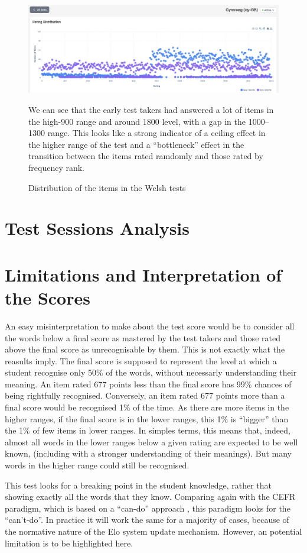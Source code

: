 \begin{figure}
    \centering
    \includegraphics[width=0.8\linewidth]{figures/cy-distribution.png}
    \caption{Distribution of the items in the Welsh tests}
    \medskip
    \small
    We can see that the early test takers had answered a lot of items in the high-900 range and around 1800 level, with a gap in the 1000–1300 range. This looks like a strong indicator of a ceiling effect in the higher range of the test and a ``bottleneck'' effect in the transition between the items rated ramdomly and those rated by frequency rank.
\end{figure}\label{fig:cy-distribution}

\section{Test Sessions Analysis}

\section{Limitations and Interpretation of the Scores}
An easy misinterpretation to make about the test score would be to consider all the words below a final score as mastered by the test takers and those rated above the final score as unrecognisable by them. This is not exactly what the reasults imply. The final score is supposed to represent the level at which a student recognise only 50\% of the words, without necessarly understanding their meaning. An item rated 677 points less than the final score has 99\% chances of being rightfully recognised. Conversely, an item rated 677 points more than a final score would be recognised 1\% of the time. As there are more items in the higher ranges, if the final score is in the lower ranges, this 1\% is ``bigger'' than the 1\% of few items in lower ranges. In simples terms, this means that, indeed, almost all words in the lower ranges below a given rating are expected to be well known, (including with a stronger understanding of their meanings). But many words in the higher range could still be recognised.

This test looks for a breaking point in the student knowledge, rather that showing exactly all the words that they know. Comparing again with the CEFR paradigm, which is based on a ``can-do'' approach \parencite{europe_common_2020}, this paradigm looks for the ``can't-do''. In practice it will work the same for a majority of cases, because of the normative nature of the Elo system update mechanism. However, an potential limitation is to be highlighted here.

